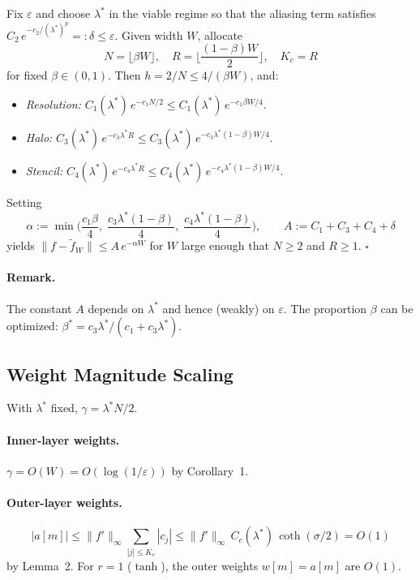 \documentclass{article}
\begin{document}
Fix \(\varepsilon\) and choose \(\lambda^*\) in the viable regime so that the aliasing term satisfies \(C_2\,e^{-c_2/(\lambda^*)^p} =: \delta \le \varepsilon\).  Given width \(W\), allocate
\[
  N = \lfloor \beta W\rfloor,
  \quad
  R = \Big\lfloor\frac{(1-\beta)W}{2}\Big\rfloor,
  \quad
  K_c = R
\]
for fixed \(\beta\in(0,1)\).  Then \(h=2/N\le 4/(\beta W)\), and:
\begin{itemize}
  \item \emph{Resolution:} \(C_1(\lambda^*)\,e^{-c_1 N/2} \le C_1(\lambda^*)\,e^{-c_1\beta W/4}\).
  \item \emph{Halo:} \(C_3(\lambda^*)\,e^{-c_3\lambda^* R} \le C_3(\lambda^*)\,e^{-c_3\lambda^*(1-\beta)W/4}\).
  \item \emph{Stencil:} \(C_4(\lambda^*)\,e^{-c_4\lambda^* R} \le C_4(\lambda^*)\,e^{-c_4\lambda^*(1-\beta)W/4}\).
\end{itemize}
Setting
\[
  \alpha := \min\!\Big(\frac{c_1\beta}{4},\;\frac{c_3\lambda^*(1-\beta)}{4},\;\frac{c_4\lambda^*(1-\beta)}{4}\Big),
  \qquad
  A := C_1 + C_3 + C_4 + \delta
\]
yields \(\|f - \widetilde{f}_W\| \le A\,e^{-\alpha W}\) for \(W\) large enough that \(N\ge 2\) and \(R\ge 1\). \hfill\(\square\)

\paragraph{Remark.}
The constant \(A\) depends on \(\lambda^*\) and hence (weakly) on \(\varepsilon\).  The proportion \(\beta\) can be optimized: \(\beta^* = c_3\lambda^*/(c_1 + c_3\lambda^*)\).

\subsection{Weight Magnitude Scaling}
\label{app:weight-scaling}

With \(\lambda^*\) fixed, \(\gamma = \lambda^* N/2\).

\paragraph{Inner-layer weights.}
\(\gamma = O(W) = O(\log(1/\varepsilon))\) by Corollary~1.

\paragraph{Outer-layer weights.}
\[
  |a[m]| \le \|f'\|_\infty\sum_{|j|\le K_c}|c_j| \le \|f'\|_\infty\,C_c(\lambda^*)\,\coth(\sigma/2) = O(1)
\]
by Lemma~2.  For \(r=1\) (\(\tanh\)), the outer weights \(w[m] = a[m]\) are \(O(1)\).
\end{document}
